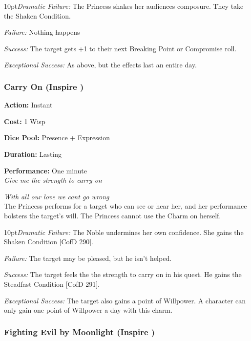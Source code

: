 \begin{myindentpar}{10pt}\emph{Dramatic Failure:} The Princess shakes her audiences composure. They take the Shaken Condition. 
 
 \emph{Failure:} Nothing happens
 
 \emph{Success:} The target gets +1 to their next Breaking Point or Compromise roll.
 
 \emph{Exceptional Success:} As above, but the effects last an entire day.
 
 \end{myindentpar}


\subsubsection*{Carry On (Inspire \textbullet\textbullet)}

\noindent \textbf{Action:} Instant

\noindent \textbf{Cost:} 1 Wisp

\noindent \textbf{Dice Pool:} Presence + Expression 

\noindent \textbf{Duration:} Lasting

\noindent \textbf{Performance:} One minute\\

\textit{Give me the strength to carry on}

\textit{With all our love we cant go wrong}\\

\noindent The Princess performs for a target who can see or hear her, and her performance bolsters the target's will. The Princess cannot use the Charm on herself.

\begin{myindentpar}{10pt}\emph{Dramatic Failure:} The Noble undermines her own confidence. She gains the Shaken Condition [CofD 290].
 
 \emph{Failure:}  The target may be pleased, but he isn’t helped.
 
 \emph{Success:} The target feels the the strength to carry on in his quest. He gains the Steadfast Condition [CofD 291].

 \emph{Exceptional Success:} The target also gains a point of Willpower. A character can only gain one point of Willpower a day with this charm. 
 
\end{myindentpar}

\subsubsection*{Fighting Evil by Moonlight (Inspire \textbullet\textbullet)}

